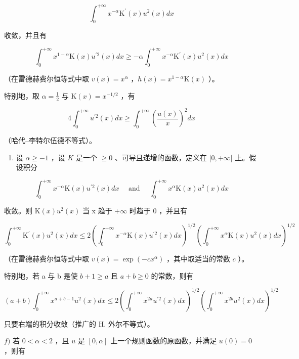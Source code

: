 \[
\int_ {0} ^ {+ \infty} x ^ {- \alpha} \mathrm{K} ^ {\prime} (x) u ^ {2} (x) d x
\]

收敛，并且有

\[
\int_ {0} ^ {+ \infty} x ^ {1 - \alpha} \mathrm{K} (x) u ^ {\prime 2} (x) d x \geqslant - \alpha \int_ {0} ^ {+ \infty} x ^ {- \alpha} \mathrm{K} ^ {\prime} (x) u ^ {2} (x) d x
\]

（在雷德赫费尔恒等式中取 \(v(x) = x^{\alpha}\) ，\(h(x) = x^{1 - \alpha}\mathrm{K}(x)\) ）。

特别地，取 \(\alpha = \frac{1}{2}\) 与 \(\mathrm{K}(x) = x^{-1 / 2}\) ，有

\[
4 \int_ {0} ^ {+ \infty} u ^ {\prime 2} (x) d x \geqslant \int_ {0} ^ {+ \infty} \left(\frac {u (x)}{x}\right) ^ {2} d x
\]

（哈代–李特尔伍德不等式）。

\begin{enumerate}
\def\labelenumi{\alph{enumi})}
\setcounter{enumi}{4}
\tightlist
\item
  设 \(\alpha \geqslant -1\) ，设 \(K\) 是一个 \(\geqslant 0\) 、可导且递增的函数，定义在 \([0, +\infty[\) 上。假设积分
\end{enumerate}

\[
\int_ {0} ^ {+ \infty} x ^ {- \alpha} \mathrm{K} (x) u ^ {\prime 2} (x) d x \quad \text { and } \quad \int_ {0} ^ {+ \infty} x ^ {\alpha} \mathrm{K} (x) u ^ {2} (x) d x
\]

收敛。则 \(\mathrm{K}(x)u^{2}(x)\) 当 x 趋于 \(+\infty\) 时趋于 0 ，并且有

\[
\int_ {0} ^ {+ \infty} \mathrm{K} ^ {\prime} (x) u ^ {2} (x) d x \leqslant 2 \left(\int_ {0} ^ {+ \infty} x ^ {- \alpha} \mathrm{K} (x) u ^ {\prime 2} (x) d x\right) ^ {1 / 2} \left(\int_ {0} ^ {+ \infty} x ^ {\alpha} \mathrm{K} (x) u ^ {2} (x) d x\right) ^ {1 / 2}
\]

（在雷德赫费尔恒等式中取 \(v(x) = \exp(-cx^{\alpha})\) ，其中取适当的常数 \(c\) ）。

特别地，若 a 与 b 是使 \(b + 1 \geqslant a\) 且 \(a + b \geqslant 0\) 的常数，则有

\[
(a + b) \int_ {0} ^ {+ \infty} x ^ {a + b - 1} u ^ {2} (x) d x \leqslant 2 \left(\int_ {0} ^ {+ \infty} x ^ {2 a} u ^ {\prime 2} (x) d x\right) ^ {1 / 2} \left(\int_ {0} ^ {+ \infty} x ^ {2 b} u ^ {2} (x) d x\right) ^ {1 / 2}
\]

只要右端的积分收敛（推广的 H. 外尔不等式）。

\(f)\) 若 \(0 < \alpha < 2\) ，且 \(u\) 是 \([0, \alpha]\) 上一个规则函数的原函数，并满足 \(u(0) = 0\) ，则有

